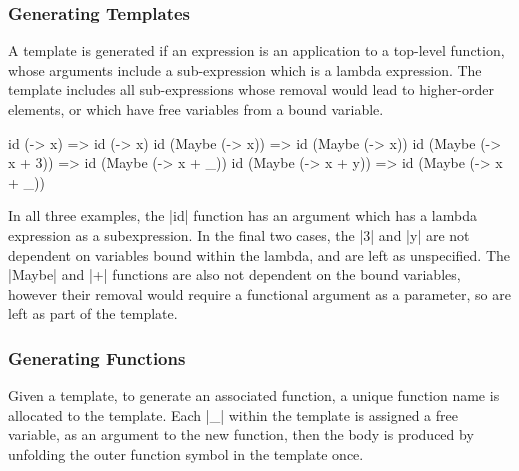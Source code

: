 \documentclass[preprint]{sigplanconf}
\begin{document}
\subsubsection{Generating Templates}

A template is generated if an expression is an application to a top-level function, whose arguments include a sub-expression which is a lambda expression. The template includes all sub-expressions whose removal would lead to higher-order elements, or which have free variables from a bound variable.

\begin{example}
\begin{code}
id (\x -> x)              => id (\x -> x)
id (Maybe (\x -> x))      => id (Maybe (\x -> x))
id (Maybe (\x -> x + 3))  => id (Maybe (\x -> x + _))
id (Maybe (\x -> x + y))  => id (Maybe (\x -> x + _))
\end{code}

In all three examples, the |id| function has an argument which has a lambda expression as a subexpression. In the final two cases, the |3| and |y| are not dependent on variables bound within the lambda, and are left as unspecified.  The |Maybe| and |+| functions are also not dependent on the bound variables, however their removal would require a functional argument as a parameter, so are left as part of the template.
\end{example}

\subsubsection{Generating Functions}

Given a template, to generate an associated function, a unique function name is allocated to the template. Each |_| within the template is assigned a free variable, as an argument to the new function, then the body is produced by unfolding the outer function symbol in the template once.
\end{document}
